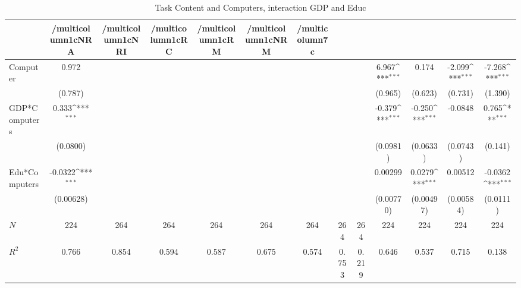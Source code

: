 \begin{table}[htbp]\centering
\def\sym#1{\ifmmode^{#1}\else\(^{#1}\)\fi}
\caption{Task Content and Computers, interaction GDP and Educ }
\begin{tabular}{l*{12}{c}}
\hline\hline
            &/multicolumn{1}{c}{NRA}&/multicolumn{1}{c}{NRI}&/multicolumn{1}{c}{RC}&/multicolumn{1}{c}{RM}&/multicolumn{1}{c}{NRM}&/multicolumn{7}{c}{}                                                                                                                                     \\
\hline
Computer    &       0.972         &                     &                     &                     &                     &                     &                     &                     &       6.967\sym{***}&       0.174         &      -2.099\sym{***}&      -7.268\sym{***}\\
            &     (0.787)         &                     &                     &                     &                     &                     &                     &                     &     (0.965)         &     (0.623)         &     (0.731)         &     (1.390)         \\
[1em]
GDP*Computers&       0.333\sym{***}&                     &                     &                     &                     &                     &                     &                     &      -0.379\sym{***}&      -0.250\sym{***}&     -0.0848         &       0.765\sym{***}\\
            &    (0.0800)         &                     &                     &                     &                     &                     &                     &                     &    (0.0981)         &    (0.0633)         &    (0.0743)         &     (0.141)         \\
[1em]
Edu*Computers&     -0.0322\sym{***}&                     &                     &                     &                     &                     &                     &                     &     0.00299         &      0.0279\sym{***}&     0.00512         &     -0.0362\sym{***}\\
            &   (0.00628)         &                     &                     &                     &                     &                     &                     &                     &   (0.00770)         &   (0.00497)         &   (0.00584)         &    (0.0111)         \\
\hline
\(N\)       &         224         &         264         &         264         &         264         &         264         &         264         &         264         &         264         &         224         &         224         &         224         &         224         \\
\(R^{2}\)   &       0.766         &       0.854         &       0.594         &       0.587         &       0.675         &       0.574         &       0.753         &       0.219         &       0.646         &       0.537         &       0.715         &       0.138         \\
\hline\hline
\end{tabular}
\end{table}
